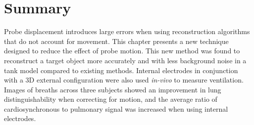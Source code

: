 \section{Summary}
Probe displacement introduces large errors when using 
reconstruction algorithms that do not account for movement. This chapter presents
a new technique designed to reduce the effect of probe motion.
This new method 
was found to  reconstruct a target object more 
accurately and with less background noise in a tank model compared to existing 
methods. 
Internal electrodes in conjunction with a 3D external configuration were also 
used \emph{in-vivo} to measure ventilation. 
Images of breaths across three subjects showed an improvement in lung distinguishability
when correcting for motion, and the average ratio of cardiosynchronous
to pulmonary signal was increased when using internal electrodes. 
